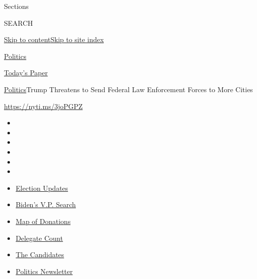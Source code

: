 Sections

SEARCH

\protect\hyperlink{site-content}{Skip to
content}\protect\hyperlink{site-index}{Skip to site index}

\href{https://www.nytimes3xbfgragh.onion/section/politics}{Politics}

\href{https://myaccount.nytimes3xbfgragh.onion/auth/login?response_type=cookie\&client_id=vi}{}

\href{https://www.nytimes3xbfgragh.onion/section/todayspaper}{Today's
Paper}

\href{/section/politics}{Politics}\textbar{}Trump Threatens to Send
Federal Law Enforcement Forces to More Cities

\url{https://nyti.ms/3joPGPZ}

\begin{itemize}
\item
\item
\item
\item
\item
\item
\end{itemize}

\begin{itemize}
\item
  \href{https://www.nytimes3xbfgragh.onion/2020/08/03/us/elections/biden-vs-trump.html?action=click\&pgtype=Article\&state=default\&region=TOP_BANNER\&context=storylines_menu}{Election
  Updates}
\item
  \href{https://www.nytimes3xbfgragh.onion/article/biden-vice-president-2020.html?action=click\&pgtype=Article\&state=default\&region=TOP_BANNER\&context=storylines_menu}{Biden's
  V.P. Search}
\item
  \href{https://www.nytimes3xbfgragh.onion/interactive/2020/07/24/us/politics/trump-biden-campaign-donors.html?action=click\&pgtype=Article\&state=default\&region=TOP_BANNER\&context=storylines_menu}{Map
  of Donations}
\item
  \href{https://www.nytimes3xbfgragh.onion/interactive/2020/us/elections/delegate-count-primary-results.html?action=click\&pgtype=Article\&state=default\&region=TOP_BANNER\&context=storylines_menu}{Delegate
  Count}
\item
  \href{https://www.nytimes3xbfgragh.onion/interactive/2019/us/politics/2020-presidential-candidates.html?action=click\&pgtype=Article\&state=default\&region=TOP_BANNER\&context=storylines_menu}{The
  Candidates}
\item
  \href{https://www.nytimes3xbfgragh.onion/newsletters/politics?action=click\&pgtype=Article\&state=default\&region=TOP_BANNER\&context=storylines_menu}{Politics
  Newsletter}
\end{itemize}

